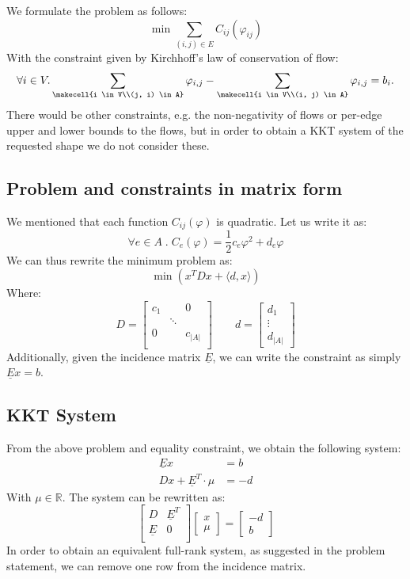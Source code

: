 \documentclass{article}
\newcommand{\reals}{\mathbb R}
\begin{document}
We formulate the problem as follows:
\[ \min \sum_{(i, j) \in E} C_{ij} (\varphi_{ij}) \]
With the constraint given by Kirchhoff's law of conservation of flow:
\[ \forall i \in V . \sum_{\scriptsize \makecell{i \in V\\(j, i) \in A}} \varphi_{i, j} - \sum_{\scriptsize \makecell{i \in V\\(i, j) \in A}} \varphi_{i, j} = b_i.\]
There would be other constraints, e.g. the non-negativity of flows or per-edge upper and lower bounds to the flows, but in order to obtain a KKT system of the requested shape we do not consider these.

\subsection{Problem and constraints in matrix form}
We mentioned that each function $C_{ij}(\varphi)$ is quadratic. Let us write it as:
\[ \forall e \in A \;.\; C_{e} (\varphi) = \dfrac12 c_{e} \varphi^2 + d_{e} \varphi \]
We can thus rewrite the minimum problem as:
\[\min \left ( x^T D x + \langle d, x \rangle \right )
\]
Where:
\[D = \begin{bmatrix}
            c_1 &  & 0\\
             &\ddots & \\
            0  & & c_{|A|}\\
           \end{bmatrix}\quad\quad d =
           \begin{bmatrix}
           d_1\\
           \vdots\\
           d_{|A|}
           \end{bmatrix}
           \]
Additionally, given the incidence matrix $\underline E$, we can write the constraint as simply $\underline E x = b$.
\subsection{KKT System}
From the above problem and equality constraint, we obtain the following system:
\begin{align}
 \underline{E} x &= b \tag{KKT-F}\\
 Dx + \underline{E}^T \cdot \mu &= -d \tag{KKT-G}
\end{align}
With $\mu \in \reals$. The system can be rewritten as:
\[
\begin{bmatrix}
D & \underline E^T\\
\underline E & 0\\
\end{bmatrix}\begin{bmatrix}
x\\ \mu
\end{bmatrix} = \begin{bmatrix}
-d\\b
\end{bmatrix}
\]
In order to obtain an equivalent full-rank system, as suggested in the problem statement, we can remove one row from the incidence matrix.
\end{document}
